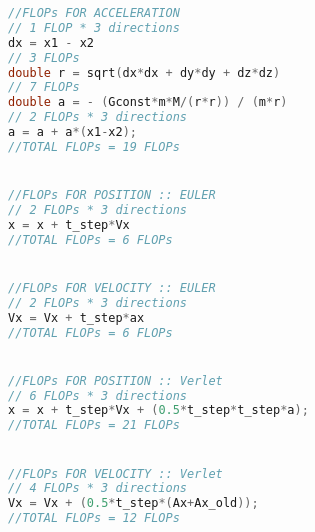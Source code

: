 \begin{lstlisting}[language=c++]
//FLOPs FOR ACCELERATION
// 1 FLOP * 3 directions
dx = x1 - x2
// 3 FLOPs
double r = sqrt(dx*dx + dy*dy + dz*dz)
// 7 FLOPs
double a = - (Gconst*m*M/(r*r)) / (m*r)
// 2 FLOPs * 3 directions
a = a + a*(x1-x2);																	
//TOTAL FLOPs = 19 FLOPs 


//FLOPs FOR POSITION :: EULER
// 2 FLOPs * 3 directions
x = x + t_step*Vx															
//TOTAL FLOPs = 6 FLOPs 


//FLOPs FOR VELOCITY :: EULER
// 2 FLOPs * 3 directions
Vx = Vx + t_step*ax															
//TOTAL FLOPs = 6 FLOPs 


//FLOPs FOR POSITION :: Verlet
// 6 FLOPs * 3 directions
x = x + t_step*Vx + (0.5*t_step*t_step*a);
//TOTAL FLOPs = 21 FLOPs


//FLOPs FOR VELOCITY :: Verlet
// 4 FLOPs * 3 directions
Vx = Vx + (0.5*t_step*(Ax+Ax_old));
//TOTAL FLOPs = 12 FLOPs
\end{lstlisting}